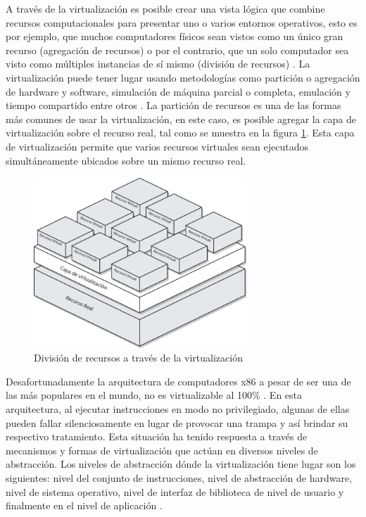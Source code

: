 A través de la virtualización es posible crear una vista lógica  que combine recursos computacionales para presentar uno o varios entornos operativos, esto es por ejemplo, que muchos computadores físicos sean vistos como un único gran recurso (agregación de recursos) o por el contrario, que un solo computador sea visto como múltiples instancias de sí mismo (división de recursos)  \parencite{Silberschatz2014}. La virtualización puede tener lugar usando metodologías como partición o agregación de hardware y software, simulación de máquina parcial o completa, emulación y tiempo compartido entre otros \parencite{Chiueh2005, Hoopes2009}. La partición de recursos es una de las formas más comunes de usar la virtualización, en este caso, es posible agregar la capa de virtualización sobre el recurso real, tal como se muestra en la figura \ref{fig:divisionDeRecursosConVirtualizacion}. Esta capa de virtualización permite que varios recursos virtuales sean ejecutados simultáneamente ubicados sobre un mismo recurso real.

\begin{figure}[!hbtp]
	\centering
	\includegraphics[width=8cm]{Pictures/divisionRecursosFisicosConV12N.pdf}
	\vspace{-0.2cm}
	\caption{División de recursos a través de la virtualización}
	\label{fig:divisionDeRecursosConVirtualizacion}
\end{figure}

Desafortunadamente la arquitectura de computadores x86 a pesar de ser una de las más populares en el mundo, no es virtualizable al 100\% \parencite{Adams}. En esta arquitectura, al ejecutar instrucciones en modo no privilegiado, algunas de ellas pueden fallar silenciosamente en lugar de provocar una trampa y así brindar su respectivo tratamiento. Esta situación ha tenido respuesta a través de mecanismos y formas de virtualización que actúan en diversos niveles de abstracción. Los niveles de abstracción dónde la virtualización tiene lugar son los siguientes: nivel del conjunto de instrucciones, nivel de abstracción de hardware, nivel de sistema operativo, nivel de interfaz de biblioteca de nivel de usuario y finalmente en el nivel de aplicación \parencite{Chiueh2005}.\\

